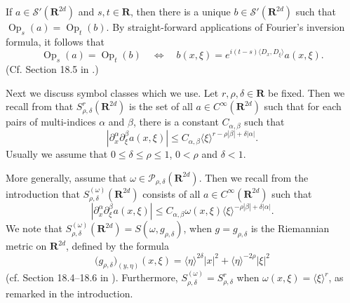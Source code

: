 \documentclass[12pt,a4paper,reqno]{amsart}
\numberwithin{equation}{section}
\numberwithin{thm}{section}
\theoremstyle{definition}
\theoremstyle{remark}
\begin{document}
\par

If $a\in \mathscr S'({\mathbf R^{{2d}}})$ and $s,t\in
\mathbf R$, then there is a unique $b\in \mathscr S'({\mathbf R^{{2d}}})$ such
that ${\operatorname{Op}} _s(a)={\operatorname{Op}} _t(b)$. By straight-forward applications of
Fourier's inversion  formula, it follows that
\begin{equation}\label{pseudorelation}
{\operatorname{Op}} _s(a)={\operatorname{Op}} _t(b) \quad \Longleftrightarrow \quad b(x,\xi
)=e^{i(t-s){\langle {D_x},{D_\xi}\rangle}}a(x,\xi ).
\end{equation}
(Cf. Section 18.5 in \cite{Ho1}.)

\par

Next we discuss symbol classes which we use. Let $r,
\rho ,\delta \in \mathbf R$ be fixed. Then we recall from
\cite{Ho1} that $S^r_{\rho ,\delta}({\mathbf R^{{2d}}})$ is the set of all $a\in
C^\infty ({\mathbf R^{{2d}}})$ such that for each pairs of multi-indices
$\alpha$ and $\beta$, there is a constant $C_{\alpha ,\beta}$ such
that
$$
|\partial _x^\alpha \partial _\xi ^\beta a(x,\xi )|\le
C_{\alpha ,\beta }{\langle \xi\rangle} ^{r-\rho |\beta |+\delta |\alpha |}.
$$
Usually we assume that $0\le \delta \le \rho \le 1$, $0<\rho$ and
$\delta <1$.

\par

More generally, assume that $\omega \in \mathscr P_{\rho ,\delta } ({\mathbf R^{{2d}}})$. Then we recall from the introduction that
$S_{\rho ,\delta}^{(\omega )}({\mathbf R^{{2d}}})$ consists of all $a\in
C^\infty ({\mathbf R^{{2d}}})$ such that
\begin{equation}\label{Somegadef}
|\partial _x^\alpha \partial _\xi ^\beta a(x,\xi )|\le
C_{\alpha ,\beta }\omega (x,\xi ){\langle \xi\rangle} ^{-\rho |\beta
|+\delta |\alpha |}.
\end{equation}
We note that $S_{\rho ,\delta}^{(\omega )}({\mathbf R^{{2d}}})=S(\omega ,g_{\rho
,\delta})$, when $g=g_{\rho 
,\delta}$ is the Riemannian metric on ${\mathbf R^{{2d}}}$, defined by the formula
$$
\big (g_{\rho ,\delta }\big )_{(y,\eta )}(x,\xi ) = {\langle \eta\rangle}
^{2\delta}|x|^2 + {\langle \eta\rangle} ^{-2\rho}|\xi |^2
$$
(cf. Section 18.4--18.6 in \cite{Ho1}). Furthermore, $S^{(\omega
)}_{\rho ,\delta} =S^r_{\rho ,\delta}$ when $\omega (x,\xi )={\langle \xi\rangle}
^r$, as remarked in the introduction.

\par
\end{document}
